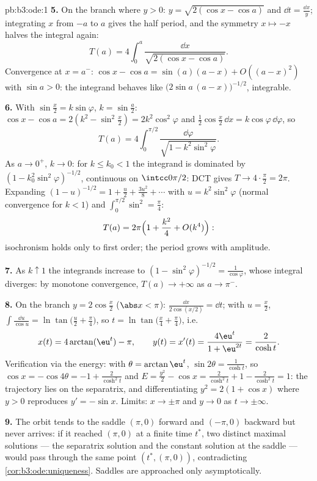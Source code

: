 \begin{solution}{pb:b3:ode:1}
\textbf{5.} On the branch where $y > 0$: $y = \sqrt{2(\cos x
- \cos a)}$ and $\dd t = \frac{\dd x}{y}$; integrating $x$
from $-a$ to $a$ gives the half period, and the symmetry $x
\mapsto -x$ halves the integral again:
\[
T(a) = 4\int_0^a\frac{\dd x}{\sqrt{2(\cos x - \cos a)}} .
\]
Convergence at $x = a^-$: $\cos x - \cos a = \sin(a)(a - x) +
O((a-x)^2)$ with $\sin a > 0$: the integrand behaves like
$\bigl(2\sin a\,(a - x)\bigr)^{-1/2}$, integrable.

\textbf{6.} With $\sin\frac x2 = k\sin\varphi$, $k =
\sin\frac a2$: $\cos x - \cos a = 2(k^2 - \sin^2\frac x2)
= 2k^2\cos^2\varphi$ and $\frac12\cos\frac x2\,\dd x =
k\cos\varphi\,\dd\varphi$, so
\[
T(a) = 4\int_0^{\pi/2}
\frac{\dd\varphi}{\sqrt{1 - k^2\sin^2\varphi}} .
\]
As $a \to 0^+$, $k \to 0$: for $k \leq k_0 < 1$ the
integrand is dominated by $(1 - k_0^2\sin^2\varphi)^{-1/2}$,
continuous on $\intcc0{\pi/2}$: DCT gives $T \to
4\cdot\frac\pi2 = 2\pi$. Expanding $(1 - u)^{-1/2} = 1 +
\frac u2 + \frac{3u^2}8 + \cdots$ with $u =
k^2\sin^2\varphi$ (normal convergence for $k < 1$) and
$\int_0^{\pi/2}\sin^2 = \frac\pi4$:
\[
T(a) = 2\pi\Bigl(1 + \frac{k^2}{4} + O(k^4)\Bigr) :
\]
isochronism holds only to first order; the period grows with
amplitude.

\textbf{7.} As $k \uparrow 1$ the integrands increase to $(1
- \sin^2\varphi)^{-1/2} = \frac1{\cos\varphi}$, whose
integral diverges: by monotone convergence, $T(a) \to
+\infty$ as $a \to \pi^-$.

\textbf{8.} On the branch $y = 2\cos\frac x2$ ($\abs x <
\pi$): $\frac{\dd x}{2\cos(x/2)} = \dd t$; with $u = \frac
x2$, $\int\frac{\dd u}{\cos u} =
\ln\tan\bigl(\frac u2 + \frac\pi4\bigr)$, so $t =
\ln\tan\bigl(\frac x4 + \frac\pi4\bigr)$, i.e.
\[
x(t) = 4\arctan(\eu^t) - \pi,
\qquad y(t) = x'(t) = \frac{4\eu^t}{1 + \eu^{2t}} =
\frac{2}{\cosh t} .
\]
Verification via the energy: with $\theta = \arctan\eu^t$,
$\sin2\theta = \frac1{\cosh t}$, so $\cos x = -\cos4\theta =
-1 + \frac{2}{\cosh^2t}$ and $E = \frac{y^2}2 - \cos x =
\frac2{\cosh^2t} + 1 - \frac2{\cosh^2t} = 1$: the trajectory
lies on the separatrix, and differentiating $y^2 = 2(1 +
\cos x)$ where $y > 0$ reproduces $y' = -\sin x$. Limits: $x
\to \pm\pi$ and $y \to 0$ as $t \to \pm\infty$.

\textbf{9.} The orbit tends to the saddle $(\pi, 0)$ forward
and $(-\pi, 0)$ backward but never arrives: if it reached
$(\pi, 0)$ at a finite time $t^*$, two distinct maximal
solutions --- the separatrix solution and the constant
solution at the saddle --- would pass through the same point
$(t^*, (\pi, 0))$, contradicting
\cref{cor:b3:ode:uniqueness}. Saddles are approached only
asymptotically.


\end{solution}
